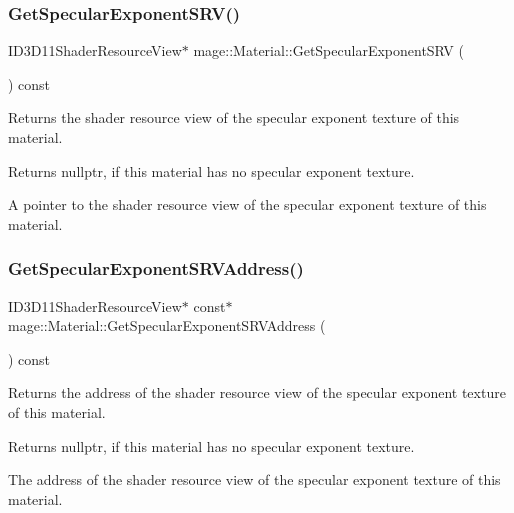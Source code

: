 \subsubsection{\texorpdfstring{Get\+Specular\+Exponent\+S\+R\+V()}{GetSpecularExponentSRV()}}
{\footnotesize\ttfamily I\+D3\+D11\+Shader\+Resource\+View$\ast$ mage\+::\+Material\+::\+Get\+Specular\+Exponent\+S\+RV (\begin{DoxyParamCaption}{ }\end{DoxyParamCaption}) const\hspace{0.3cm}{\ttfamily [noexcept]}}

Returns the shader resource view of the specular exponent texture of this material.

\begin{DoxyReturn}{Returns}
{\ttfamily nullptr}, if this material has no specular exponent texture. 

A pointer to the shader resource view of the specular exponent texture of this material. 
\end{DoxyReturn}
\hypertarget{structmage_1_1_material_a57a083f7769c5d6501282d66b6733b10}{}\label{structmage_1_1_material_a57a083f7769c5d6501282d66b6733b10} 
\subsubsection{\texorpdfstring{Get\+Specular\+Exponent\+S\+R\+V\+Address()}{GetSpecularExponentSRVAddress()}}
{\footnotesize\ttfamily I\+D3\+D11\+Shader\+Resource\+View$\ast$ const$\ast$ mage\+::\+Material\+::\+Get\+Specular\+Exponent\+S\+R\+V\+Address (\begin{DoxyParamCaption}{ }\end{DoxyParamCaption}) const\hspace{0.3cm}{\ttfamily [noexcept]}}

Returns the address of the shader resource view of the specular exponent texture of this material.

\begin{DoxyReturn}{Returns}
{\ttfamily nullptr}, if this material has no specular exponent texture. 

The address of the shader resource view of the specular exponent texture of this material. 
\end{DoxyReturn}
\hypertarget{structmage_1_1_material_a24c476c257c3ba042ddda666c26660c0}{}\label{structmage_1_1_material_a24c476c257c3ba042ddda666c26660c0} 
